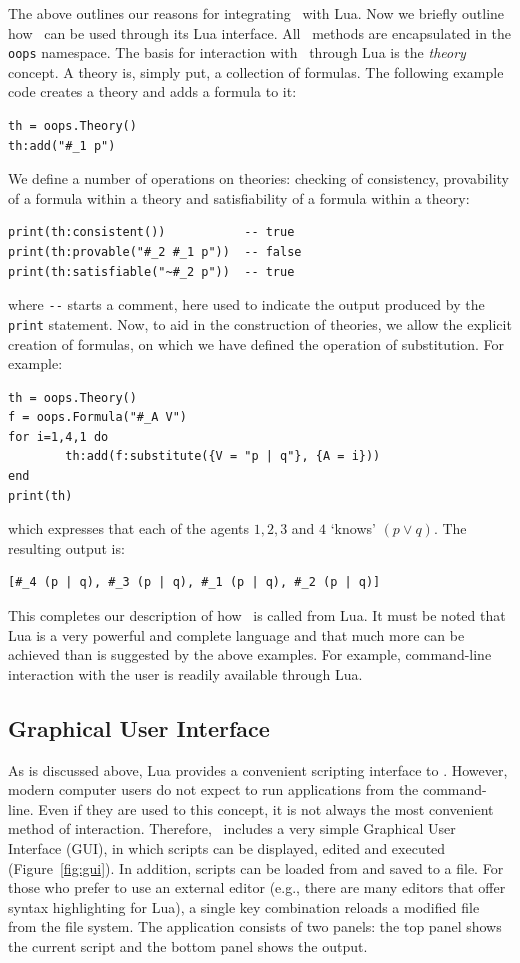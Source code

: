 The above outlines our reasons for integrating \oops\ with Lua. Now
we briefly outline how \oops\ can be used through its Lua interface.
All \oops\ methods are encapsulated in the \lstinline!oops! namespace.
The basis for interaction with \oops\ through Lua is the {\em theory} concept.
A theory is, simply put, a collection of formulas. The following example code
creates a theory and adds a formula to it:
\begin{lstlisting}
th = oops.Theory()
th:add("#_1 p")
\end{lstlisting}
We define a number of operations on theories: checking of consistency,
provability of a formula within a theory and satisfiability of a formula
within a theory:
\begin{lstlisting}
print(th:consistent())           -- true
print(th:provable("#_2 #_1 p"))  -- false
print(th:satisfiable("~#_2 p"))  -- true
\end{lstlisting}
where \lstinline!--! starts a comment, here used to indicate the output
produced by the \lstinline!print! statement. 
Now, to aid in the construction of theories, we allow the explicit creation of
formulas, on which we have defined the operation of substitution. For example:
\begin{lstlisting}
th = oops.Theory()
f = oops.Formula("#_A V")
for i=1,4,1 do
        th:add(f:substitute({V = "p | q"}, {A = i}))
end
print(th)
\end{lstlisting}
which expresses that each of the agents $1, 2, 3$ and $4$ `knows' $(p \vee
q)$. The resulting output is:
\begin{lstlisting}
[#_4 (p | q), #_3 (p | q), #_1 (p | q), #_2 (p | q)]
\end{lstlisting}

This completes our description of how \oops\ is called from Lua. It must be
noted that Lua is a very powerful and complete language and that much more can be achieved than is suggested by the above examples. For
example, command-line interaction with the user is readily available through
Lua.

\subsection{Graphical User Interface}

As is discussed above, Lua provides a convenient scripting interface to \oops.
However, modern computer users do not expect to run applications from the
command-line. Even if they are used to this concept, it is not always the most
convenient method of interaction. Therefore,
\oops\ includes a very simple Graphical User Interface (GUI), in which scripts
can be displayed, edited and executed (Figure~\ref{fig:gui}). In addition,
scripts can be loaded from and saved to a file. For those who prefer to use an
external editor (e.g., there are many editors that offer syntax highlighting
for Lua), a single key combination reloads a modified file from the
file system. The application consists of two panels: the top panel shows the
current script and the bottom panel shows the
output.

